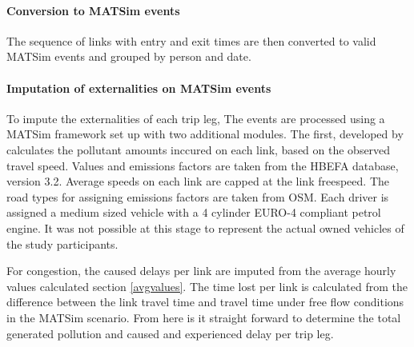 \paragraph{Conversion to MATSim events} 
The sequence of links with entry and exit times are then converted to valid MATSim events and grouped by person and date.

\paragraph{Imputation of externalities on MATSim events}
To impute the externalities of each trip leg, The events are processed using a MATSim framework set up with two additional modules. The first, developed by \citet{kaddoura} calculates the pollutant amounts inccured on each link, based on the observed travel speed. Values and emissions factors are taken from the HBEFA database, version 3.2. Average speeds on each link are capped at the link freespeed. The road types for assigning emissions factors are taken from OSM. Each driver is assigned a medium sized vehicle with a 4 cylinder EURO-4 compliant petrol engine. It was not possible at this stage to represent the actual owned vehicles of the study participants.

For congestion, the caused delays per link are imputed from the average hourly values calculated section \ref{avgvalues}. The time lost per link is calculated from the difference between the link travel time and travel time under free flow conditions in the MATSim scenario. From here is it straight forward to determine the total generated pollution and caused and experienced delay per trip leg.
